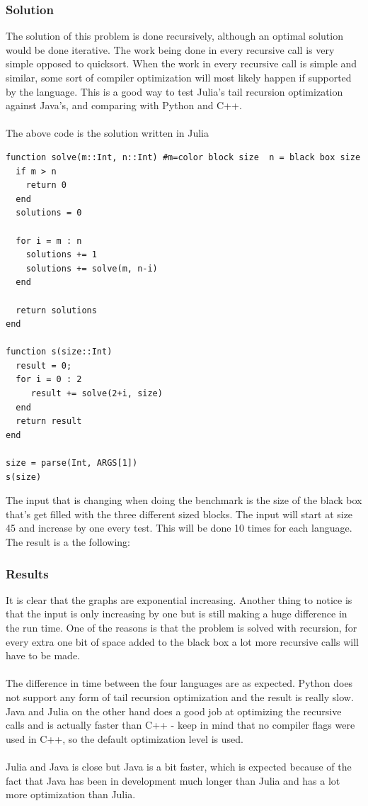 \documentclass[a4paper, 11pt, titlepage]{article}
\begin{document}
\subsubsection{Solution}
The solution of this problem is done recursively, although an optimal solution would be done iterative. The work being done in every recursive call is very simple opposed to quicksort. When the work in every recursive call is simple and similar, some sort of compiler optimization will most likely happen if supported by the language. This is a good way to test Julia’s tail recursion optimization against Java's, and comparing with Python and C++.\\
\\
The above code is the solution written in Julia
\begin{lstlisting}
function solve(m::Int, n::Int) #m=color block size  n = black box size
  if m > n
    return 0
  end
  solutions = 0

  for i = m : n
    solutions += 1
    solutions += solve(m, n-i)
  end

  return solutions
end

function s(size::Int)
  result = 0;
  for i = 0 : 2
     result += solve(2+i, size)
  end
  return result
end

size = parse(Int, ARGS[1])
s(size)
\end{lstlisting}
The input that is changing when doing the benchmark is the size of the black box that's get filled with the three different sized blocks. The input will start at size 45 and increase by one every test. This will be done 10 times for each language. The result is a the following:
\subsubsection{Results}
It is clear that the graphs are exponential increasing. Another thing to notice is that the input is only increasing by one but is still making a huge difference in the run time. One of the reasons is that the problem is solved with recursion, for every extra one bit of space added to the black box a lot more recursive calls will have to be made.\\
\\
The difference in time between the four languages are as expected. Python does not support any form of tail recursion optimization and the result is really slow. Java and Julia on the other hand does a good job at optimizing the recursive calls and is actually faster than C++ - keep in mind that no compiler flags were used in C++, so the default optimization level is used.\\
\\
Julia and Java is close but Java is a bit faster, which is expected because of the fact that Java has been in development much longer than Julia and has a lot more optimization than Julia.
\end{document}
